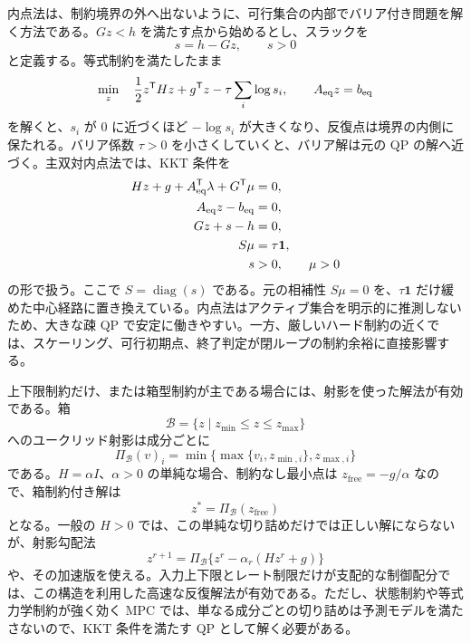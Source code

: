 内点法は、制約境界の外へ出ないように、可行集合の内部でバリア付き問題を解く方法である。$Gz<h$ を満たす点から始めるとし、スラックを
\begin{equation}
  s=h-Gz,
  \qquad s>0
\end{equation}
と定義する。等式制約を満たしたまま
\begin{equation}
  \min_z\quad
  \frac{1}{2}z^{\mathsf{T}} Hz+g^{\mathsf{T}} z
  -\tau\sum_i\log s_i,
  \qquad
  A_{\mathrm{eq}}z=b_{\mathrm{eq}}
\end{equation}
を解くと、$s_i$ が 0 に近づくほど $-\log s_i$ が大きくなり、反復点は境界の内側に保たれる。バリア係数 $\tau>0$ を小さくしていくと、バリア解は元の QP の解へ近づく。主双対内点法では、KKT 条件を
\begin{align}
  Hz+g+A_{\mathrm{eq}}^{\mathsf{T}}\lambda+G^{\mathsf{T}}\mu&=0,\\
  A_{\mathrm{eq}}z-b_{\mathrm{eq}}&=0,\\
  Gz+s-h&=0,\\
  S\mu&=\tau\mathbf{1},\\
  s&>0,\qquad \mu>0
\end{align}
の形で扱う。ここで $S=\operatorname{diag}(s)$ である。元の相補性 $S\mu=0$ を、$\tau\mathbf{1}$ だけ緩めた中心経路に置き換えている。内点法はアクティブ集合を明示的に推測しないため、大きな疎 QP で安定に働きやすい。一方、厳しいハード制約の近くでは、スケーリング、可行初期点、終了判定が閉ループの制約余裕に直接影響する。

上下限制約だけ、または箱型制約が主である場合には、射影を使った解法が有効である。箱
\begin{equation}
  \mathcal{B}=\{z\mid z_{\min}\le z\le z_{\max}\}
\end{equation}
へのユークリッド射影は成分ごとに
\begin{equation}
  \Pi_{\mathcal{B}}(v)_i
  =
  \min\{\max\{v_i,z_{\min,i}\},z_{\max,i}\}
\end{equation}
である。$H=\alpha I$、$\alpha>0$ の単純な場合、制約なし最小点は $z_{\mathrm{free}}=-g/\alpha$ なので、箱制約付き解は
\begin{equation}
  z^*=\Pi_{\mathcal{B}}(z_{\mathrm{free}})
\end{equation}
となる。一般の $H>0$ では、この単純な切り詰めだけでは正しい解にならないが、射影勾配法
\begin{equation}
  z^{r+1}
  =
  \Pi_{\mathcal{B}}\{z^r-\alpha_r(Hz^r+g)\}
\end{equation}
や、その加速版を使える。入力上下限とレート制限だけが支配的な制御配分では、この構造を利用した高速な反復解法が有効である。ただし、状態制約や等式力学制約が強く効く MPC では、単なる成分ごとの切り詰めは予測モデルを満たさないので、KKT 条件を満たす QP として解く必要がある。

